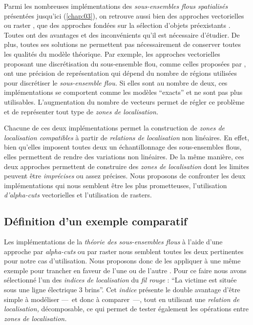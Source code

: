 Parmi les nombreuses implémentations des \emph{sous-ensembles flous
  spatialisés} présentées jusqu'ici (\autoref{chap:03}), on retrouve
aussi bien des approches vectorielles
\autocite{Kanjilal2010,Dilo2007,Zoghlami2016} ou raster
\autocite{Bloch1996}, que des approches fondées sur la sélection
d'objets préexistants \autocite{Duraciova2017}. Toutes ont des
avantages et des inconvénients qu'il est nécessaire d'étudier. De
plus, toutes ses solutions ne permettent pas nécessairement de
conserver toutes les qualités du modèle théorique. Par exemple, les
approches vectorielles proposant une discrétisation du sous-ensemble
flou, comme celles proposées par \textcite{Kanjilal2010,Zoghlami2016},
ont une précision de représentation qui dépend du nombre de régions
utilisées pour discrétiser le \emph{sous-ensemble flou.} Si elles sont
au nombre de deux, ces implémentations se comportent comme les modèles
\enquote{exacts} et ne sont pas plus utilisables. L'augmentation du
nombre de vecteurs permet de régler ce problème et de représenter tout
type de \emph{zones de localisation.}

Chacune de ces deux implémentations permet la construction de
\emph{zones de localisation compatibles} à partir de \emph{relations
  de localisation} non linéaires. En effet, bien qu'elles imposent
toutes deux un échantillonnage des sous-ensembles flous, elles
permettent de rendre des variations non linéaires. De la même manière,
ces deux approches permettent de construire des \emph{zones de
  localisation} dont les limites peuvent être \emph{imprécises} ou
assez précises. Nous proposons de confronter les deux implémentations
qui nous semblent être les plus prometteuses, l'utilisation
\emph{d'alpha-cuts} vectorielles et l'utilisation de rasters.

\subsection{Définition d'un exemple comparatif}

Les implémentations de la \emph{théorie des sous-ensembles flous} à
l'aide d'une approche par \emph{alpha-cuts} ou par raster nous
semblent toutes les deux pertinentes pour notre cas
d'utilisation. Nous proposons donc de les appliquer à une même exemple
pour trancher en faveur de l'une ou de l'autre
\autocite{Bunel2019a}. Pour ce faire nous avons sélectionné l'un des
\emph{indices de localisation} du \emph{fil rouge} : \enquote{La
  victime est située sous une ligne électrique 3 brins}. Cet
\emph{indice} présente le double avantage d'être simple à modéliser
---~et donc à comparer~---, tout en utilisant une \emph{relation de
  localisation,} décomposable, ce qui permet de tester également les
opérations entre \emph{zones de localisation.}

